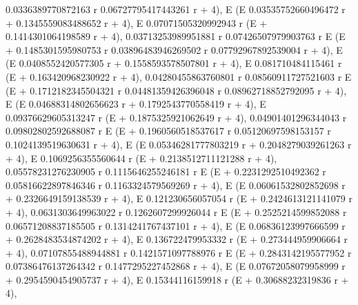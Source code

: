 \documentclass{article}
\begin{document}
            0.0336389770872163 r   0.06727795417443261 r
     + 4), E                     (E
                                   0.03535752660496472 r
     + 0.1345559083488652 r + 4), E
       0.07071505320992943 r
     (E                      + 0.1414301064198589 r + 4), 
     0.03713253989951881 r   0.07426507979903763 r
    E                      (E                      + 0.1485301595980753 r
            0.03896483946269502 r   0.07792967892539004 r
     + 4), E                      (E
                                   0.0408552420577305 r
     + 0.1558593578507801 r + 4), E
       0.081710484115461 r
     (E                    + 0.163420968230922 r + 4), 
     0.04280455863760801 r   0.08560911727521603 r
    E                      (E                      + 0.1712182345504321 r
            0.04481359426396048 r   0.08962718852792095 r
     + 4), E                      (E
                                   0.04688314802656623 r
     + 0.1792543770558419 r + 4), E
       0.09376629605313247 r
     (E                      + 0.1875325921062649 r + 4), 
     0.04901401296344043 r   0.09802802592688087 r
    E                      (E                      + 0.1960560518537617 r
            0.05120697598153157 r   0.1024139519630631 r
     + 4), E                      (E
                                   0.05346281777803219 r
     + 0.2048279039261263 r + 4), E
       0.1069256355560644 r
     (E                     + 0.2138512711121288 r + 4), 
     0.05578231276230905 r   0.1115646255246181 r
    E                      (E                     + 0.2231292510492362 r
            0.05816622897846346 r   0.1163324579569269 r
     + 4), E                      (E
                                   0.06061532802852698 r
     + 0.2326649159138539 r + 4), E
       0.121230656057054 r
     (E                    + 0.2424613121141079 r + 4), 
     0.0631303649963022 r   0.1262607299926044 r
    E                     (E                     + 0.2525214599852088 r
            0.06571208837185505 r   0.1314241767437101 r
     + 4), E                      (E
                                   0.06836123997666599 r
     + 0.2628483534874202 r + 4), E
       0.136722479953332 r
     (E                    + 0.273444959906664 r + 4), 
     0.07107855488944881 r   0.1421571097788976 r
    E                      (E                     + 0.2843142195577952 r
            0.07386476137264342 r   0.1477295227452868 r
     + 4), E                      (E
                                   0.07672058079958999 r
     + 0.2954590454905737 r + 4), E
       0.15344116159918 r
     (E                   + 0.30688232319836 r + 4), 
\end{document}
